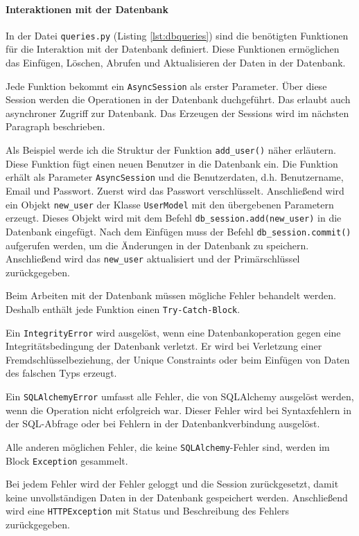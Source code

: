 \documentclass[12pt, letterpaper]{article}
\begin{document}
  \paragraph{Interaktionen mit der Datenbank}
  \textbf{}
  \par In der Datei \texttt{queries.py} (Listing \ref{lst:dbqueries}) sind die benötigten Funktionen für die Interaktion mit der Datenbank definiert. Diese Funktionen ermöglichen das Einfügen, Löschen, Abrufen und Aktualisieren der Daten in der Datenbank.
  \par Jede Funktion bekommt ein \texttt{AsyncSession} als erster Parameter. Über diese Session werden die Operationen in der Datenbank duchgeführt. Das erlaubt auch asynchroner Zugriff zur Datenbank. Das Erzeugen der Sessions wird im nächsten Paragraph beschrieben. 
  \par Als Beispiel werde ich die Struktur der Funktion \texttt{add\_user()} näher erläutern. Diese Funktion fügt einen neuen Benutzer in die Datenbank ein. Die Funktion erhält als Parameter \texttt{AsyncSession} und die Benutzerdaten, d.h. Benutzername, Email und Passwort. Zuerst wird das Passwort verschlüsselt. Anschließend wird ein Objekt \texttt{new\_user} der Klasse \texttt{UserModel} mit den übergebenen Parametern erzeugt. Dieses Objekt wird mit dem Befehl \texttt{db\_session.add(new\_user)} in die Datenbank eingefügt. Nach dem Einfügen muss der Befehl \texttt{db\_session.commit()} aufgerufen werden, um die Änderungen in der Datenbank zu speichern. Anschließend wird das \texttt{new\_user} aktualisiert und der Primärschlüssel zurückgegeben.
  \par Beim Arbeiten mit der Datenbank müssen mögliche Fehler behandelt werden. Deshalb enthält jede Funktion einen \texttt{Try-Catch-Block}. 
  \par Ein \texttt{IntegrityError} wird ausgelöst, wenn eine Datenbankoperation gegen eine Integritätsbedingung der Datenbank verletzt. Er wird bei Verletzung einer Fremdschlüsselbeziehung, der Unique Constraints oder beim Einfügen von Daten des falschen Typs erzeugt. 
  \par Ein \texttt{SQLAlchemyError} umfasst alle Fehler, die von SQLAlchemy ausgelöst werden, wenn die Operation nicht erfolgreich war. Dieser Fehler wird bei Syntaxfehlern in der SQL-Abfrage oder bei Fehlern in der Datenbankverbindung ausgelöst.
  \par Alle anderen möglichen Fehler, die keine \texttt{SQLAlchemy}-Fehler sind, werden im Block \texttt{Exception} gesammelt.
  \par Bei jedem Fehler wird der Fehler geloggt und die Session zurückgesetzt, damit keine unvollständigen Daten in der Datenbank gespeichert werden. Anschließend wird eine \texttt{HTTPException} mit Status und Beschreibung des Fehlers zurückgegeben.
\end{document}

